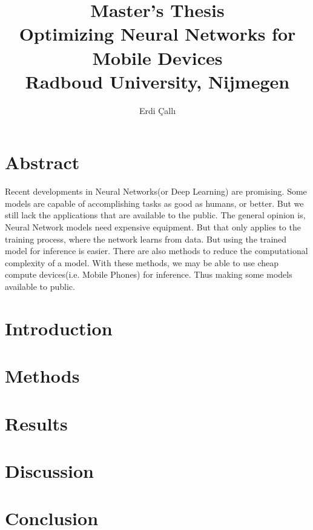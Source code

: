 \documentclass[12pt]{report}
\title{
{\textbf{Master's Thesis}\\Optimizing Neural Networks for Mobile Devices}\\
{\large Radboud University, Nijmegen}
}
\author{Erdi \c{C}all{\i}}
\begin{document}
\maketitle
\chapter*{Abstract}
Recent developments in Neural Networks(or Deep Learning) are promising. Some models are capable of accomplishing tasks as good as humans, or better. But we still lack the applications that are available to the public. The general opinion is, Neural Network models need expensive equipment. But that only applies to the training process, where the network learns from data. But using the trained model for inference is easier. There are also methods to reduce the computational complexity of a model. With these methods, we may be able to use cheap compute devices(i.e. Mobile Phones) for inference. Thus making some models available to public. 




\tableofcontents

\chapter{Introduction}


\chapter{Methods}




\chapter{Results}


\chapter{Discussion}


\chapter{Conclusion}






\end{document}
